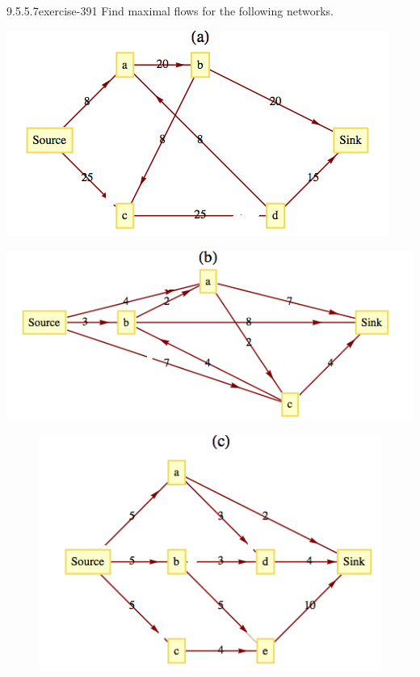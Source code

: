 \documentclass[twoside,10pt,]{book}
\numberwithin{equation}{section}
\begin{document}
\begin{divisionsolution}{9.5.5.7}{}{exercise-391}%
\hypertarget{p-3407}{}%
Find maximal flows for the following networks.%
\begin{sidebyside}{2}{0}{0}{0}%
\begin{sbspanel}{0.5}%
\includegraphics[width=1\linewidth]{images/fig-exercise-9-5-7a.png}
\end{sbspanel}%
\begin{sbspanel}{0.5}%
\includegraphics[width=1\linewidth]{images/fig-exercise-9-5-7b.png}
\end{sbspanel}%
\nopagebreak%
\begin{sbscaption}{0.5}%
\end{sbscaption}%
\begin{sbscaption}{0.5}%
\end{sbscaption}%
\end{sidebyside}%
\begin{figure}
\centering
\includegraphics[width=0.7\linewidth]{images/fig-exercise-9-5-7c.png}

\end{figure}
\end{divisionsolution}
\end{document}
